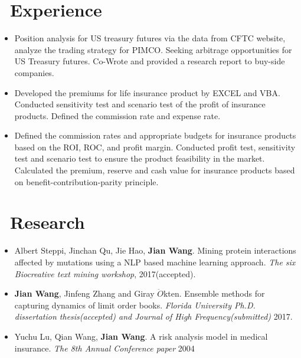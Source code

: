 \documentclass{resume}
\begin{document}
\section{\faGears\ Experience}
\large {}
\begin{itemize}\large
	\item Position analysis for US treasury futures via the data from CFTC website,  analyze the trading strategy for PIMCO. Seeking arbitrage opportunities for US Treasury futures. Co-Wrote and provided a research report to buy-side companies.  
\end{itemize}
\large {}
\begin{itemize}\large
  \item Developed the premiums for life insurance product by EXCEL and VBA. Conducted sensitivity test and scenario test of the profit of insurance products. Defined the commission rate and expense rate. 
  
  
\end{itemize}

\large {}
\begin{itemize}\large
  \item Defined the commission rates and appropriate budgets for insurance products based on the ROI,  ROC, and profit margin. Conducted profit test,  sensitivity test and scenario test to ensure the product feasibility in the market. Calculated the premium,  reserve and cash value for insurance products based on benefit-contribution-parity principle.
\end{itemize}
\section{\faBook\ Research}

\begin{itemize}[parsep=0.5ex]\large
  \item Albert Steppi, Jinchan Qu, Jie Hao, \textbf{Jian Wang}. Mining protein interactions affected by mutations using a NLP based machine learning approach. \textit{The six Biocreative text mining workshop}, 2017(accepted).
  \item \textbf{Jian Wang}, Jinfeng Zhang and Giray $\ddot{O}$kten. Ensemble methods for capturing dynamics of limit order books. \textit{Florida University Ph.D. dissertation thesis(accepted) and Journal of High Frequency(submitted)} 2017.
  \item Yuchu Lu, Qian Wang, \textbf{Jian Wang}. A risk analysis model in medical insurance. \textit{The 8th Annual Conference paper} 2004 
  
\end{itemize}
    
\end{document}
